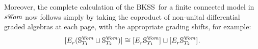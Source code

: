 \documentclass[11pt]{amsart} \renewcommand{\baselinestretch}{1.2}
\theoremstyle{plain}
\newtheorem{lem}[thm]{Lemma}
\numberwithin{equation}{section} %
\theoremstyle{plain}
\newtheorem{lem}[thm]{Lemma}
\numberwithin{equation}{chapter} %
\renewcommand{\to}{\longrightarrow}
\newcommand{\scrC}{\mathscr{C}}
\newcommand{\produces}[3]{#3:#1\sim #2}
\renewcommand{\produces}[3]{#1\rightarrow_{#3} #2}%
\renewcommand{\produces}[3]{#1\overset{\smash{#3}}{\rightarrow} #2}%
\newcommand{\Sq}{\mathrm{Sq}}
\newcommand{\algs}{{\scrC\!\textit{\normalfont\textit{om}}}}
\newcommand{\E}[5]{[E^{#1}_{#2}#3]^{#4}_{#5}}
\newcommand{\uver}{^\mathrm{v}}
\newcommand{\dhor}{_\mathrm{h}}
\newcommand{\Sqh}{\mathrm{Sq}\dhor}
\newcommand{\deltav}{\delta\uver}
\renewcommand{\mapsto}{\longmapsto}
\newcommand{\BKSS}{BKSS}
\begin{document}
\begin{The Bousfield-Kan spectral sequence for a sphere}
Moreover, the complete calculation of the \BKSS\ for a finite connected model in $s\algs$ now follows simply by taking the coproduct of non-unital differential graded algebras at each page, with the appropriate grading shifts, for example:
\[\E{}{r}{(\mathbb{S}_{T_1}^\algs\sqcup \mathbb{S}_{T_2}^\algs)}{}{}\cong \E{}{r}{\mathbb{S}_{T_1}^\algs}{}{}\sqcup \E{}{r}{\mathbb{S}_{T_2}^\algs}{}{}.\]


%
%
%
%
%
%
%
%
%
%
%
%



\end{The Bousfield-Kan spectral sequence for a sphere}
\end{document}
